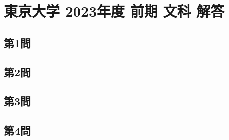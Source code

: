 ﻿\documentclass[../../uem_mat_tok_a.tex]{subfiles}
\begin{document}
    \section{東京大学 2023年度 前期 文科 解答}

    \subsection{第1問}
    

    \clearpage
    \subsection{第2問}
    

    \clearpage
    \subsection{第3問}
    

    \clearpage
    \subsection{第4問}
    

    \clearpage
\end{document}
